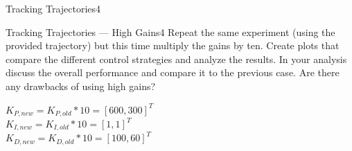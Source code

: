 \begin{questions}
\begin{question}{Tracking Trajectories}{4}
	\end{question}
	
	
	\begin{question}{Tracking Trajectories --- High Gains}{4}
		Repeat the same experiment (using the provided trajectory) but this time multiply the gains by ten. Create plots that compare the different control strategies and analyze the results. In your analysis discuss the overall performance and compare it to the previous case. Are there any drawbacks of using high gains?
		
\begin{answer}
	$K_{P,new}=K_{P,old}*10=[600,300]^T$ \\
	$K_{I,new}=K_{I,old}*10=[1,1]^T$\\
	$K_{D,new}=K_{D,old}*10=[100,60]^T$
	

\end{answer}
\end{question}
\end{questions}
